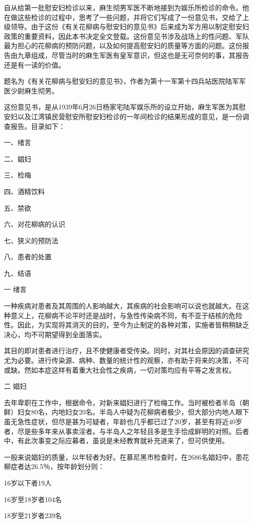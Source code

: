 \documentclass[12pt,UTF8]{ctexbook}
\begin{document}
自从给第一批慰安妇检诊以来，麻生彻男军医不断地接到为娱乐所检诊的命令。他在做这些检诊的过程中，思考了一些问题，并将它们写成了一份意见书，交给了上级领导。由于这份《有关花柳病与慰安妇的意见书》后来成为军方用以制定慰安妇政策的重要资料，因此本书决定全文登载。这份意见书涉及战场上的性问题、军队最为担心的花柳病的预防问题，以及如何提高慰安妇的质量等方面的问题。这份报告由九章组成，尽管当时的麻生军医有皇军意识，但这也是无可奈何的事，其报告还是有一读的价值。

题名为《有关花柳病与慰安妇的意见书》，作者为第十一军第十四兵站医院陆军军医少尉麻生彻男。

这份意见书，是从1939年6月26日杨家宅陆军娱乐所的设立开始，麻生军医为其慰安妇以及江湾镇民营慰安所慰安妇检诊的一年间检诊的结果形成的意见，是一份调查报告。目录如下：

一、绪言

二、娼妇

三、检梅

四、酒精饮料

五、禁欲

六、对花柳病的认识

七、狭义的预防法

八、患者的处置

九、结语

一 绪言

一种疾病对患者及其周围的人影响越大，其疾病的社会影响可以说也就越大。在这种意义上，花柳病不论平时还是战时，与急性传染病不同，有不亚于结核的危险性。因此，为实现将其消灭的目的，至今为止制定的各种对策，实施者皆稍稍缺乏决心，均不可期望得到全面落实。

其目的即对患者进行治疗，且不使健康者受传染。同时，对其社会原因的调查研究尤为必要。进行传染源、病种、数量的统计性的观察，亦有助于将来的决策，不可或缺。然如本症这样有着重大社会性之疾病，一切对策均应有平等之发言权。

二 娼妇

去年卑职在工作中，根据命令，对新来娼妇进行了检梅工作。当时被检者半岛（朝鲜）妇女80名，内地妇女20名。半岛人中疑为花柳病者极少，但大部分内地人眼下虽无急性症状，但尽是甚为可疑者，年龄也几乎都已过了20岁，甚至有将近40岁者，尽是些多年来从事卖淫者。与半岛人之年轻且多是生手恰成鲜明的对照。后者中，有此次事变之际应募者，虽说是未经教育就补充进来了，但可供使用。

一般来说娼妇的质量，以年轻者为好。在慕尼黑市检查时，在2686名娼妇中，患花柳症者达26.5％，按年龄划分则：

16岁以下者19人

16岁至18岁者104名

18岁至21岁者239名
\end{document}
